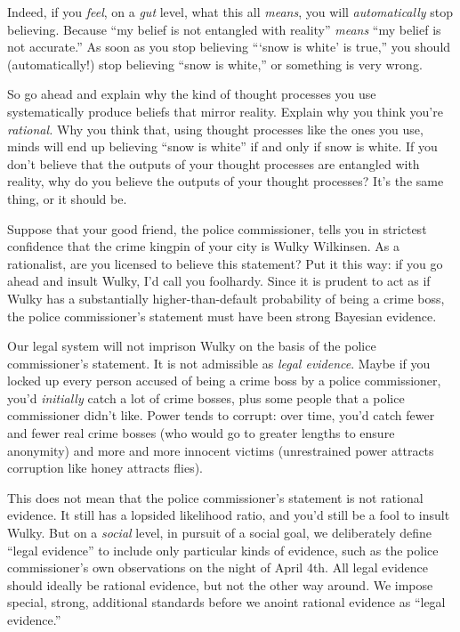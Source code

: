 {
 Indeed, if you \textit{feel}, on a \textit{gut} level, what this
all \textit{means}, you will \textit{automatically} stop believing.
Because ``my belief is not entangled with
reality'' \textit{means} ``my belief
is not accurate.'' As soon as you stop believing
```snow is white' is
true,'' you should (automatically!) stop believing
``snow is white,'' or something is
very wrong.}

{
 So go ahead and explain why the kind of thought processes you use
systematically produce beliefs that mirror reality. Explain why you
think you're \textit{rational.} Why you think that,
using thought processes like the ones you use, minds will end up
believing ``snow is white'' if and
only if snow is white. If you don't believe that the
outputs of your thought processes are entangled with reality, why do
you believe the outputs of your thought processes? It's
the same thing, or it should be.}

\myendsectiontext


{
 Suppose that your good friend, the police commissioner, tells you
in strictest confidence that the crime kingpin of your city is Wulky
Wilkinsen. As a rationalist, are you licensed to believe this
statement? Put it this way: if you go ahead and insult Wulky,
I'd call you foolhardy. Since it is prudent to act as
if Wulky has a substantially higher-than-default probability of being a
crime boss, the police commissioner's statement must
have been strong Bayesian evidence. }

{
 Our legal system will not imprison Wulky on the basis of the
police commissioner's statement. It is not admissible
as \textit{legal evidence}. Maybe if you locked up every person accused
of being a crime boss by a police commissioner, you'd
\textit{initially} catch a lot of crime bosses, plus some people that a
police commissioner didn't like. Power tends to
corrupt: over time, you'd catch fewer and fewer real
crime bosses (who would go to greater lengths to ensure anonymity) and
more and more innocent victims (unrestrained power attracts corruption
like honey attracts flies).}

{
 This does not mean that the police commissioner's
statement is not rational evidence. It still has a lopsided likelihood
ratio, and you'd still be a fool to insult Wulky. But
on a \textit{social} level, in pursuit of a social goal, we
deliberately define ``legal
evidence'' to include only particular kinds of
evidence, such as the police commissioner's own
observations on the night of April 4th. All legal evidence should
ideally be rational evidence, but not the other way around. We impose
special, strong, additional standards before we anoint rational
evidence as ``legal evidence.''}

